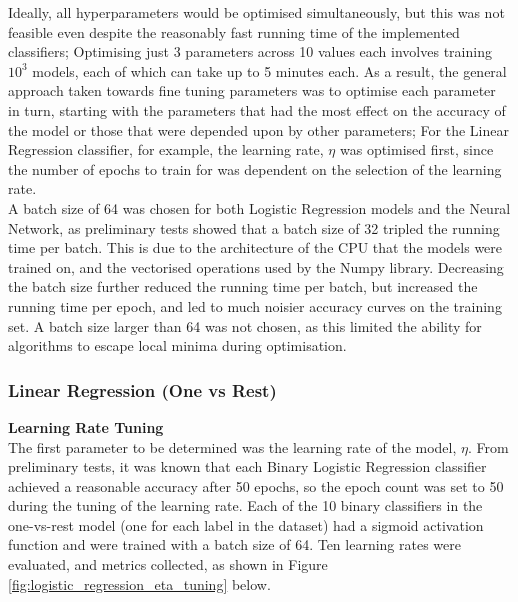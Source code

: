 \documentclass[11pt,a4paper]{article}
\begin{document}
\noindent Ideally, all hyperparameters would be optimised simultaneously, but this was not feasible even despite the reasonably fast running time of the implemented classifiers; Optimising just 3 parameters across 10 values each involves training $10^3$ models, each of which can take up to 5 minutes each. As a result, the general approach taken towards fine tuning parameters was to optimise each parameter in turn, starting with the parameters that had the most effect on the accuracy of the model or those that were depended upon by other parameters; For the Linear Regression classifier, for example, the learning rate, $\eta$ was optimised first, since the number of epochs to train for was dependent on the selection of the learning rate.\\

\noindent A batch size of 64 was chosen for both Logistic Regression models and the Neural Network, as preliminary tests showed that a batch size of 32 tripled the running time per batch. This is due to the architecture of the CPU that the models were trained on, and the vectorised operations used by the Numpy library. Decreasing the batch size further reduced the running time per batch, but increased the running time per epoch, and led to much noisier accuracy curves on the training set. A batch size larger than 64 was not chosen, as this limited the ability for algorithms to escape local minima during optimisation.\\

\subsubsection*{Linear Regression (One vs Rest)}

\noindent\textbf{Learning Rate Tuning}\\
The first parameter to be determined was the learning rate of the model, $\eta$. From preliminary tests, it was known that each Binary Logistic Regression classifier achieved a reasonable accuracy after 50 epochs, so the epoch count was set to 50 during the tuning of the learning rate. Each of the 10 binary classifiers in the one-vs-rest model (one for each label in the dataset) had a sigmoid activation function and were trained with a batch size of 64. Ten learning rates were evaluated, and metrics collected, as shown in Figure \ref{fig:logistic_regression_eta_tuning} below.
\end{document}
